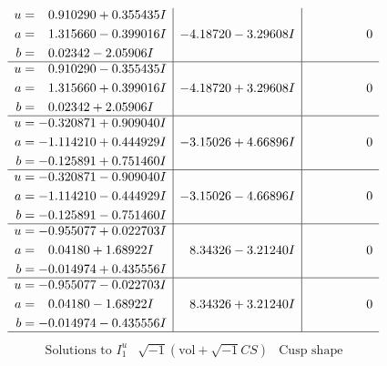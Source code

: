 \documentclass[1p]{elsarticle_modified}
\theoremstyle{definition}
\newcommand{\I}{\sqrt{-1}}
\begin{document}
$$\begin{array}{c|c|c}
\begin{aligned}
u &= \phantom{-}0.910290 + 0.355435 I \\
a &= \phantom{-}1.315660 - 0.399016 I \\
b &= \phantom{-}0.02342 - 2.05906 I\end{aligned}
 & -4.18720 - 3.29608 I & \phantom{-0.000000 } 0 \\ \hline\begin{aligned}
u &= \phantom{-}0.910290 - 0.355435 I \\
a &= \phantom{-}1.315660 + 0.399016 I \\
b &= \phantom{-}0.02342 + 2.05906 I\end{aligned}
 & -4.18720 + 3.29608 I & \phantom{-0.000000 } 0 \\ \hline\begin{aligned}
u &= -0.320871 + 0.909040 I \\
a &= -1.114210 + 0.444929 I \\
b &= -0.125891 + 0.751460 I\end{aligned}
 & -3.15026 + 4.66896 I & \phantom{-0.000000 } 0 \\ \hline\begin{aligned}
u &= -0.320871 - 0.909040 I \\
a &= -1.114210 - 0.444929 I \\
b &= -0.125891 - 0.751460 I\end{aligned}
 & -3.15026 - 4.66896 I & \phantom{-0.000000 } 0 \\ \hline\begin{aligned}
u &= -0.955077 + 0.022703 I \\
a &= \phantom{-}0.04180 + 1.68922 I \\
b &= -0.014974 + 0.435556 I\end{aligned}
 & \phantom{-}8.34326 - 3.21240 I & \phantom{-0.000000 } 0 \\ \hline\begin{aligned}
u &= -0.955077 - 0.022703 I \\
a &= \phantom{-}0.04180 - 1.68922 I \\
b &= -0.014974 - 0.435556 I\end{aligned}
 & \phantom{-}8.34326 + 3.21240 I & \phantom{-0.000000 } 0\\
 \hline 
 \end{array}$$\newpage$$\begin{array}{c|c|c}  
\text{Solutions to }I^u_{1}& \I (\text{vol} + \sqrt{-1}CS) & \text{Cusp shape}\\
 \hline 
\begin{aligned}

\end{aligned}
\end{array}$$
\end{document}
